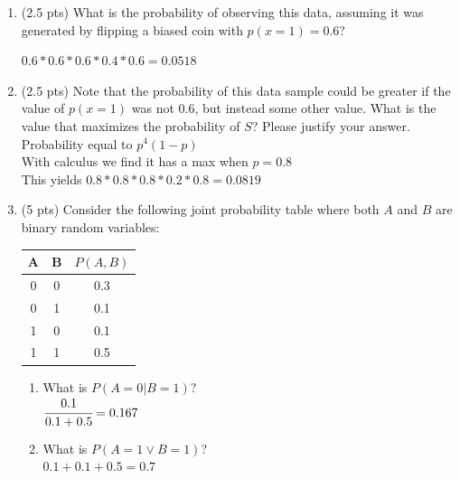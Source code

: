 \documentclass[a4paper]{article}
\theoremstyle{definition}
\newenvironment{soln}{
	\leavevmode\color{blue}\ignorespaces
}{}
\begin{document}
	\begin{enumerate}
		\item 	(2.5 pts) What is the probability of observing this data, assuming it was generated by flipping a biased coin with $p(x=1) = 0.6$?
		
		\begin{soln}  $0.6*0.6*0.6*0.4*0.6=0.0518$ \end{soln}
		
		\item 	(2.5 pts) Note that the probability of this data sample could be greater if the value of $p(x = 1)$ was not $0.6$, but instead some other value. What is the value that maximizes the probability of $S$? Please justify your answer.\\
		\begin{soln} Probability equal to $p^{4}(1-p)$ \\
		With calculus we find it has a max when $p=0.8$ \\
		This yields $0.8*0.8*0.8*0.2*0.8=0.0819$
		\end{soln}
		
		\item 	(5 pts) Consider the following joint probability table where both $A$ and $B$ are binary random variables: 
		\begin{table}[htb]
			\centering
			\begin{tabular}{ccc}\hline
				A & B & $P(A, B)$  \\\hline
				0 & 0 & 0.3 \\
				0 & 1 & 0.1 \\
				1 & 0 & 0.1 \\
				1 & 1 & 0.5 \\\hline
			\end{tabular}
		\end{table}
		\begin{enumerate}
			\item 	What is $P(A = 0 | B = 1)$?\\
			 \begin{soln}  $\cfrac{0.1}{0.1+0.5}=0.167$ \end{soln}
			 
			\item 	What is $P(A = 1 \vee B = 1 )$?\\
		     \begin{soln}  $0.1+0.1+0.5=0.7$ \end{soln}
		\end{enumerate}
	\end{enumerate}
	
\end{document}
